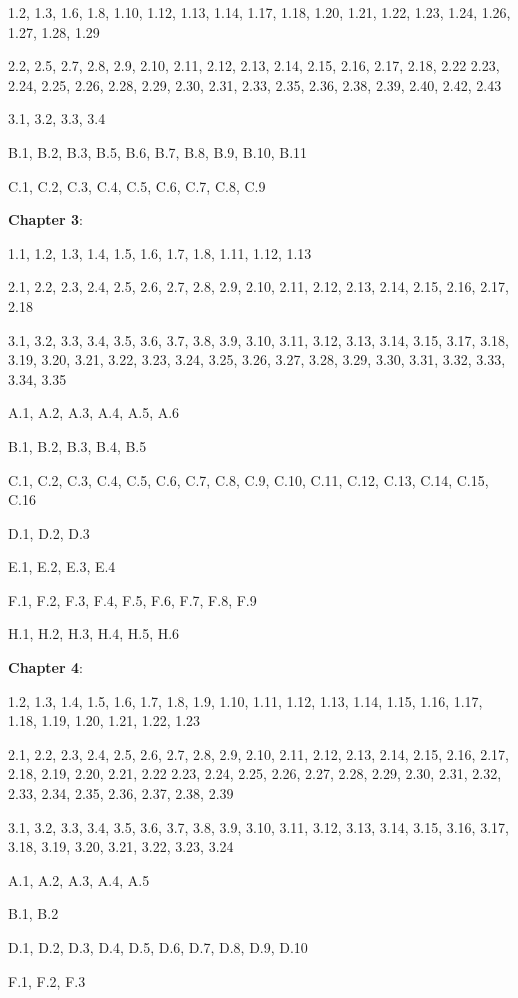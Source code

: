 \documentclass{article}
\begin{document}
1.2, 1.3, 1.6, 1.8, 1.10, 1.12, 1.13, 1.14, 1.17, 1.18, 1.20, 1.21, 1.22, 1.23, 1.24, 1.26, 1.27, 1.28, 1.29

2.2, 2.5, 2.7, 2.8, 2.9, 2.10, 2.11, 2.12, 2.13, 2.14, 2.15, 2.16, 2.17, 2.18, 2.22 2.23, 2.24, 2.25, 2.26, 2.28, 2.29, 2.30, 2.31, 2.33, 2.35, 2.36, 2.38, 2.39, 2.40, 2.42, 2.43

3.1, 3.2, 3.3, 3.4

B.1, B.2, B.3, B.5, B.6, B.7, B.8, B.9, B.10, B.11

C.1, C.2, C.3, C.4, C.5, C.6, C.7, C.8, C.9
\medskip

\textbf{Chapter 3}:
\medskip

1.1, 1.2, 1.3, 1.4, 1.5, 1.6, 1.7, 1.8, 1.11, 1.12, 1.13

2.1, 2.2, 2.3, 2.4, 2.5, 2.6, 2.7, 2.8, 2.9, 2.10, 2.11, 2.12, 2.13, 2.14, 2.15, 2.16, 2.17, 2.18

3.1, 3.2, 3.3, 3.4, 3.5, 3.6, 3.7, 3.8, 3.9, 3.10, 3.11, 3.12, 3.13, 3.14, 3.15, 3.17, 3.18, 3.19, 3.20, 3.21, 3.22, 3.23, 3.24, 3.25, 3.26, 3.27, 3.28, 3.29, 3.30, 3.31, 3.32, 3.33, 3.34, 3.35

A.1, A.2, A.3, A.4, A.5, A.6

B.1, B.2, B.3, B.4, B.5

C.1, C.2, C.3, C.4, C.5, C.6, C.7, C.8, C.9, C.10, C.11, C.12, C.13, C.14, C.15, C.16

D.1, D.2, D.3

E.1, E.2, E.3, E.4

F.1, F.2, F.3, F.4, F.5, F.6, F.7, F.8, F.9

H.1, H.2, H.3, H.4, H.5, H.6
\medskip

\textbf{Chapter 4}:
\medskip

1.2, 1.3, 1.4, 1.5, 1.6, 1.7, 1.8, 1.9, 1.10, 1.11, 1.12, 1.13, 1.14, 1.15, 1.16, 1.17, 1.18, 1.19, 1.20, 1.21, 1.22, 1.23

2.1, 2.2, 2.3, 2.4, 2.5, 2.6, 2.7, 2.8, 2.9, 2.10, 2.11, 2.12, 2.13, 2.14, 2.15, 2.16, 2.17, 2.18, 2.19, 2.20, 2.21, 2.22 2.23, 2.24, 2.25, 2.26, 2.27, 2.28, 2.29, 2.30, 2.31, 2.32, 2.33, 2.34, 2.35, 2.36, 2.37, 2.38, 2.39

3.1, 3.2, 3.3, 3.4, 3.5, 3.6, 3.7, 3.8, 3.9, 3.10, 3.11, 3.12, 3.13, 3.14, 3.15, 3.16, 3.17, 3.18, 3.19, 3.20, 3.21, 3.22, 3.23, 3.24

A.1, A.2, A.3, A.4, A.5

B.1, B.2

D.1, D.2, D.3, D.4, D.5, D.6, D.7, D.8, D.9, D.10

F.1, F.2, F.3
\end{document}
